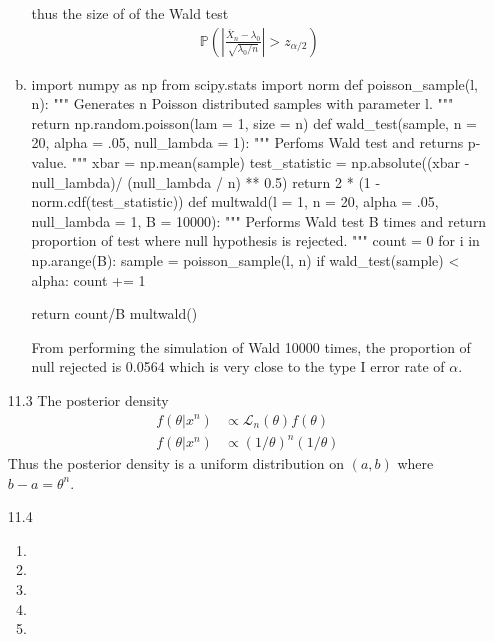 \documentclass[a4paper,10pt]{article}
\theoremstyle{definition}
\begin{document}
\begin{enumerate}
\begin{enumerate}[(a)]
thus the size of of the Wald test
\begin{align*}
\mathbb{P}\left(\left|\frac{\overline{X}_n-\lambda_0}{\sqrt{\lambda_0/n}}\right|>z_{\alpha/2}\right)
\end{align*}
\item 
\begin{python}
import numpy as np
from scipy.stats import norm
def poisson_sample(l, n):
    """
    Generates n Poisson distributed samples with parameter l.
    """
    return np.random.poisson(lam = 1, size = n)
def wald_test(sample, n = 20, alpha = .05, null_lambda = 1):
    """
    Perfoms Wald test and returns p-value.
    """
    xbar = np.mean(sample)
    test_statistic = np.absolute((xbar - null_lambda)/ (null_lambda / n) ** 0.5)
    return  2 * (1 - norm.cdf(test_statistic))
def multwald(l = 1, n = 20, alpha = .05, null_lambda = 1, B = 10000):
    """
    Performs Wald test B times and return proportion of test where null hypothesis is rejected.
    """
    count = 0
    for i in np.arange(B):
        sample = poisson_sample(l, n)
        if wald_test(sample) < alpha:
            count += 1

    return count/B
multwald()            
\end{python}
From performing the simulation of Wald 10000 times, the proportion of null rejected is 0.0564 which is very close to the type I error rate of $\alpha$.
\end{enumerate}
\item[11.3] The posterior density 
\begin{align*}
f(\theta|x^n) &\propto \mathcal{L}_n(\theta)f(\theta)\\
f(\theta|x^n) &\propto (1/\theta)^n(1/\theta)
\end{align*}
Thus the posterior density is a uniform distribution on $(a,b)$ where $b-a=\theta^n$.
\item[11.4]
\begin{enumerate}
\item 
\item
\item
\item
\item
\end{enumerate}
\end{enumerate}
\end{document}
